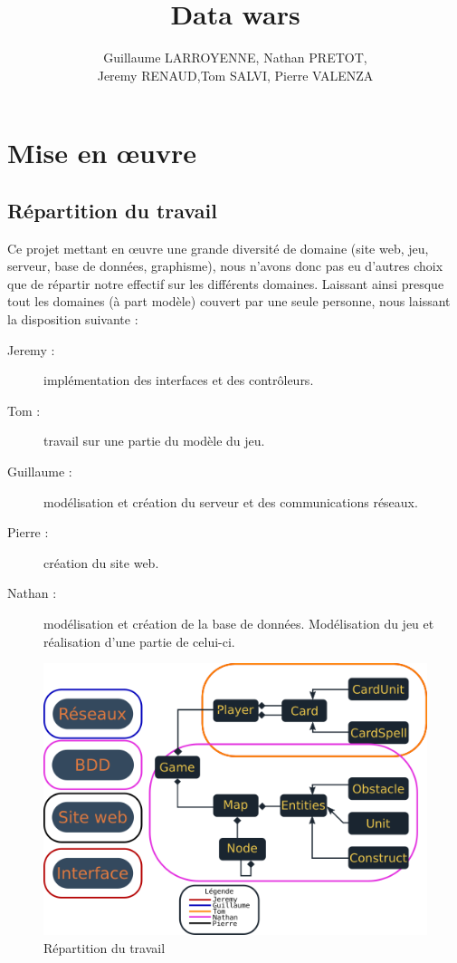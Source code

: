 \documentclass[a4paper,11pt]{report}
\title{Data wars}
\author{Guillaume LARROYENNE, Nathan PRETOT,\\ Jeremy RENAUD,Tom SALVI, Pierre VALENZA}
\begin{document}
\maketitle
\tableofcontents

\begin{abstract}
\end{abstract}

\chapter{Mise en œuvre}

  \section{Répartition du travail}
    Ce projet mettant en œuvre une grande diversité de domaine (site web, jeu, serveur, base de données, graphisme), nous n'avons donc pas eu d'autres choix que de répartir notre effectif sur les différents domaines. Laissant ainsi presque tout les domaines (à part modèle) couvert par une seule personne, nous laissant la disposition suivante :
    \begin{description}
      \item[Jeremy : ] implémentation des interfaces et des contrôleurs.
      \item[Tom : ] travail sur une partie du modèle du jeu.
      \item[Guillaume :] modélisation et création du serveur et des communications réseaux.
      \item[Pierre :] création du site web.
      \item[Nathan :] modélisation et création de la base de données. Modélisation du jeu et réalisation d'une partie de celui-ci.
    \end{description}
    
    \begin{figure}[th]
      \begin{center}
        \includegraphics[scale=0.365]{Assets/UMLRepartition.png}
        \caption{Répartition du travail}
        \label{RepTravail}
      \end{center}
    \end{figure}
    
\end{document}
